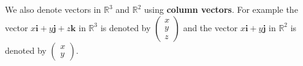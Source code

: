 \documentclass[titlepage,a4paper,12pt]{report}
\begin{document}
\noindent We also denote vectors in $\mathbb{R}^3$ and $\mathbb{R}^2$ using \textbf{column vectors}. For example the vector $x\textbf{i}+y\textbf{j}+z\textbf{k}$ in $\mathbb{R}^3$ is denoted by $\begin{pmatrix}
x\\
y\\
z
\end{pmatrix}$ and the vector $x\textbf{i}+y\textbf{j}$ in $\mathbb{R}^2$ is denoted by $\begin{pmatrix}
x\\
y
\end{pmatrix}$.
\end{document}
